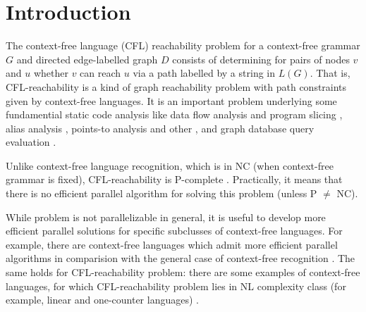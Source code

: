 \documentclass[smallextended]{svjour3}       %
\begin{document}
\section{Introduction}
\label{intro}
The context-free language (CFL) reachability problem for a context-free grammar $G$ and directed edge-labelled graph $D$ consists of determining for pairs of nodes  $v$ and $u$ whether $v$ can reach $u$ via a path labelled by a string in $L(G)$.  That is, CFL-reachability is a kind of graph reachability problem with path constraints given by context-free languages. It is an important problem underlying some fundamential static code analysis like data flow analysis and program slicing \cite{RepsBasic}, alias analysis \cite*{Chatterjee, alias}, points-to analysis \cite{Incremental} and other \cite*{Cai, android, typeflow}, and graph database query evaluation \cite*{Azimov, GrigorevRagozina, HellingsCFPQ, RDF}.


Unlike context-free language recognition, which is in NC (when context-free grammar is fixed), CFL-reachability is P-complete \cite*{ RepSeq, Yannakakis}. Practically, it means that there is no efficient parallel algorithm for solving this problem (unless P $\neq$ NC). 


While problem is not parallelizable in general, it is useful to develop more efficient parallel solutions for specific subclusses of context-free languages. For example, there are context-free languages which admit more efficient parallel algorithms in comparision with the general case of context-free recognition \cite*{IBARRA, IBARRA2, Okhotin2014ComplexityOI}.  The same holds for CFL-reachability problem: there are some examples of context-free languages, for which CFL-reachability problem lies in NL complexity class (for example, linear and one-counter languages) \cite*{LabelledGraphs, LReach, Regularrealizability}. 
\end{document}
